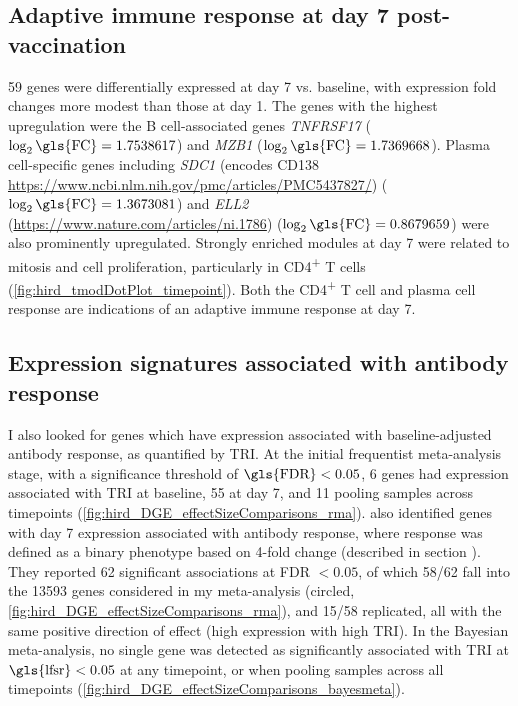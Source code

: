 \subsection{Adaptive immune response at day 7 post-vaccination}

59 genes were differentially expressed at day 7 vs. baseline, with expression fold changes more modest than those at day 1.
The genes with the highest upregulation were the B cell-associated genes \textit{TNFRSF17} ($\log_2\text{\gls{FC}} = 1.7538617$) and \textit{MZB1} ($\log_2\text{\gls{FC}} = 1.7369668$).
Plasma cell-specific genes including \textit{SDC1} (encodes CD138 \url{https://www.ncbi.nlm.nih.gov/pmc/articles/PMC5437827/}) ($\log_2\text{\gls{FC}} = 1.3673081$) and \textit{ELL2} (\url{https://www.nature.com/articles/ni.1786}) ($\log_2\text{\gls{FC}} = 0.8679659$) were also prominently upregulated.
Strongly enriched modules at day 7 were related to mitosis and cell proliferation, particularly in CD4\textsuperscript{+} T cells (\autoref{fig:hird_tmodDotPlot_timepoint}).
Both the CD4\textsuperscript{+} T cell and plasma cell response are indications of an adaptive immune response at day 7.

\subsection{Expression signatures associated with antibody response}

I also looked for genes which have expression associated with baseline-adjusted antibody response, as quantified by \gls{TRI}.
At the initial frequentist meta-analysis stage, with a significance threshold of $\text{\gls{FDR}} < 0.05$, 6 genes had expression associated with \gls{TRI} at baseline, 55 at day 7, and 11 pooling samples across timepoints (\autoref{fig:hird_DGE_effectSizeComparisons_rma}).
\autocite{sobolev2016AdjuvantedInfluenzaH1N1Vaccination} also identified genes with day 7 expression associated with antibody response, where response was defined as a binary phenotype based on 4-fold change (described in section ).
They reported 62 significant associations at \gls{FDR} $< 0.05$, of which 58/62 fall into the 13593 genes considered in my meta-analysis (circled, \autoref{fig:hird_DGE_effectSizeComparisons_rma}), and 15/58 replicated, all with the same positive direction of effect (high expression with high \gls{TRI}).
In the Bayesian meta-analysis, no single gene was detected as significantly associated with \gls{TRI} at $\text{\gls{lfsr}} < 0.05$ at any timepoint, or when pooling samples across all timepoints (\autoref{fig:hird_DGE_effectSizeComparisons_bayesmeta}).

